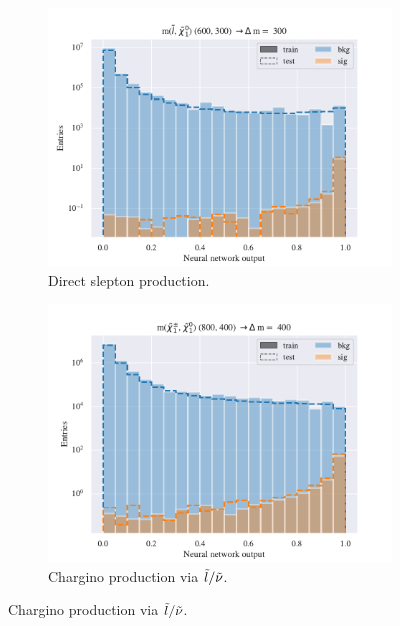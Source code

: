 \begin{figure}[H]
    \centering
    \begin{subfigure}[t!]{0.49\textwidth}
        \includegraphics[width = \textwidth]{Figures/SlepSlep/ML/NN/All_level/Inter/scaled_train_test_396014.pdf}
        \caption{Direct slepton production.}
        \label{fig:SlepslepNNInter}
    \end{subfigure}
    \begin{subfigure}[t!]{0.49\textwidth}
        \includegraphics[width = \textwidth]{Figures/SlepSnu/NN/All_level/Inter/scaled_train_test_397150.pdf}
        \caption{Chargino production via $\Tilde{l}/\Tilde{\nu}$.}
        \label{fig:SlepsnuNNInter}
    \end{subfigure}    

\end{figure}

